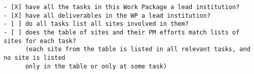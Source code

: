 \begin{draft}
\begin{verbatim}
- [X] have all the tasks in this Work Package a lead institution?
- [X] have all deliverables in the WP a lead institution?
- [ ] do all tasks list all sites involved in them? 
- [ ] does the table of sites and their PM efforts match lists of sites for each task?
      (each site from the table is listed in all relevant tasks, and no site is listed
      only in the table or only at some task)
\end{verbatim}
\end{draft}



